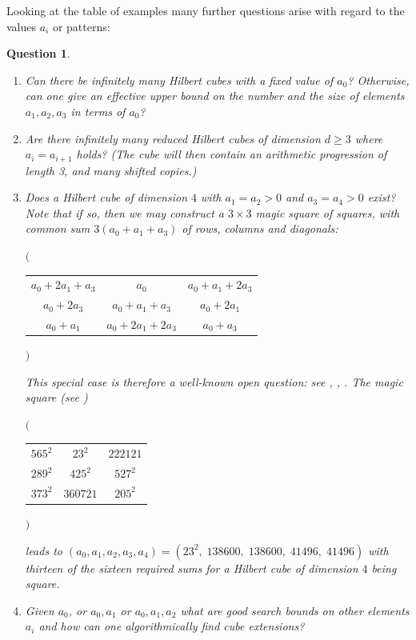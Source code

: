 \documentclass[10pt]{amsart}
\theoremstyle{plain}
\newtheorem{ques}[thm]{Question}
\begin{document}
Looking at the table of examples many further questions arise with regard to the values $a_i$ or patterns:
\begin{ques}\label{genques}
\begin{enumerate}
    \item 
    Can there be infinitely many Hilbert cubes with a fixed value of $a_0$? Otherwise, can one give an effective upper bound on the number and the size of elements $a_1,a_2,a_3$ in terms of $a_0$?
     \item Are there infinitely many reduced Hilbert cubes of dimension $d \geq 3$ where
     $a_i=a_{i+1}$ holds? (The cube will then contain an arithmetic progression of length 3, and many shifted copies.)
\item Does a Hilbert cube of dimension $4$ with $a_1=a_2>0$ and $ a_3=a_4>0$ exist? Note that if so, then we may construct a $3 \times 3$ magic square of squares, with common sum $3(a_0+a_1+a_3)$ of rows, columns and diagonals:
\begin{center}
        $\Biggl($
\begin{tabular}{ccc}
        $a_0+2 a_1+a_3$ & $a_0$ & $a_0+a_1+2 a_3$ \\
        $a_0+2 a_3$ & $a_0+a_1+a_3$ & $a_0+2 a_1$ \\
        $a_0+a_1$ & $a_0+2 a_1+2 a_3$ & $a_0+a_3$
\end{tabular}
        $\Biggr)$
\end{center}
This special case is therefore a well-known open question: see \cite{Robertson}, \cite{Bremner:1999}, \cite{Bremner:2001}. The magic square (see \cite{Bremner:1999})
\begin{center}
        $\Biggl($
\begin{tabular}{ccc}
        $565^2$ & $23^2$ & $222121$ \\
        $289^2$ & $425^2$ & $527^2$ \\
        $373^2$ & $360721$ & $205^2$
\end{tabular}
        $\Biggr)$
\end{center}
leads to $(a_0,a_1,a_2,a_3,a_4)=(23^2, \; 138600, \; 138600, \; 41496, \; 41496)$ with thirteen of the sixteen required sums for a Hilbert cube of dimension $4$ being square.
     \item
     Given $a_0$, or $a_0,a_1$ or $a_0,a_1,a_2$ what are good search bounds 
     on other elements $a_i$ and how can one algorithmically find cube extensions?
     \end{enumerate}
     \end{ques}
\end{document}
